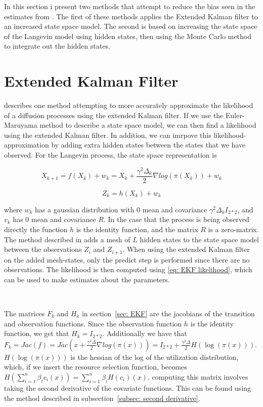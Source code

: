 
\label{chap: methods}
In this section i present two methods that attempt to reduce the bias seen in the estimates from \cite{michelot_langevin_2019}. The first of these methods applies the Extended Kalman filter to an increased state space model. The second is based on increasing the state space of the Langevin model using hidden states, then using the Monte Carlo method to integrate out the hidden states. 

\section{Extended Kalman Filter}
\parencite{kulikov_extended_2024} describes one method attempting to more accurately approximate the likelihood of a diffusion processes using the extended Kalman filter. If we use the Euler-Maruyama method to describe a state space model, we can then find a likelihood using the extended Kalman filter. In addition, we can imrpove this likelihood-approximation by adding extra hidden states between the states that we have observed. For the Langevin process, the state space representation is 

$$X_{k+1} = f(X_k) + w_k = X_k + \frac{\gamma^2\Delta_k}{2}\nabla log(\pi(X_k)) + w_k$$

$$Z_k = h(X_k) + w_k$$

where $w_k$ has a gaussian distribution with $0$ mean and covariance $\gamma^2\Delta_k I_{2*2}$, and $v_k$ has $0$ mean and covariance $R$. In the case that the process is being observed directly the function $h$ is the identity function, and the matrix $R$ is a zero-matrix. The method described in \parencite{kulikov_extended_2024} adds a mesh of $L$ hidden states to the state space model between the observations $Z_i$ and $Z_{i+1}$. When using the extended Kalman filter on the added mesh-states, only the predict step is performed since there are no observations. The likelihood is then computed using \eqref{eq: EKF likelihood}, which can be used to make estimates about the parameters. 

\

The matrices $F_k$ and $H_k$ in section~\ref{sec: EKF} are the jacobians of the transition and observation functions. Since the observation function $h$ is the identity function, we get that $H_k = I_{2*2}$. Additionally we have that $F_k = Jac(f) = Jac(x + \frac{\gamma^2 \Delta}{2}\nabla log(\pi(x))) = I_{2*2} + \frac{\gamma^2 \Delta}{2} H(\log(\pi(x)))$. $H(\log(\pi(x)))$ is the hessian of the log of the utilization distribution, which, if we insert the resource selection function, becomes $H(\sum_{i=1}^n \beta_i c_i(x)) = \sum_{i=1}^n \beta_iH( c_i)(x)$. computing this matrix involves taking the second derivative of the covariate functions. This can be found using the method described in subsection~\ref{subsec: second derivative}.

